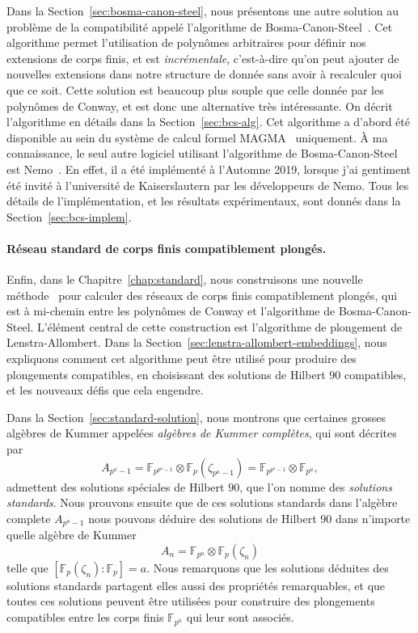 Dans la Section~\ref{sec:bosma-canon-steel}, nous présentons une autre solution
au problème de la compatibilité appelé l'algorithme de
Bosma-Canon-Steel~\cite{BCS97}. Cet algorithme permet l'utilisation de polynômes
arbitraires pour définir nos extensions de corps finis, et est
\emph{incrémentale}, c'est-à-dire qu'on peut ajouter de nouvelles extensions
dans notre structure de donnée sans avoir à recalculer quoi que ce soit. Cette
solution est beaucoup plus souple que celle donnée par les polynômes de Conway,
et est donc une alternative très intéressante. On décrit l'algorithme en détails
dans la Section~\ref{sec:bcs-alg}. Cet algorithme a d'abord été disponible au
sein du système de calcul formel MAGMA~\cite{Magma} uniquement. À ma
connaissance, le seul autre logiciel utilisant l'algorithme de Bosma-Canon-Steel
est Nemo~\cite{Nemo}. En effet, il a été implémenté à l'Automne 2019, lorsque
j'ai gentiment été invité à l'université de Kaiserslautern par les
développeurs de Nemo. Tous les détails de l'implémentation, et les résultats
expérimentaux, sont donnés dans la Section~\ref{sec:bcs-implem}.

\paragraph{Réseau standard de corps finis compatiblement plongés.} Enfin, dans
le Chapitre~\ref{chap:standard}, nous construisons une nouvelle
méthode~\cite{DRR19} pour calculer des réseaux de corps finis compatiblement
plongés, qui est à mi-chemin entre les polynômes de Conway et l'algorithme de
Bosma-Canon-Steel. L'élément central de cette construction est l'algorithme de
plongement de Lenstra-Allombert. Dans la
Section~\ref{sec:lenstra-allombert-embeddings}, nous expliquons comment cet
algorithme peut être utilisé pour produire des plongements compatibles, en
choisissant des solutions de Hilbert $90$ compatibles, et les nouveaux défis que
cela engendre.

Dans la Section~\ref{sec:standard-solution}, nous montrons que certaines grosses
algèbres de Kummer appelées \emph{algèbres de Kummer complètes}, qui sont
décrites par
\[
  A_{p^a-1} = \mathbb{F}_{p^{p^a-1}}\otimes\mathbb{F}_{p}(\zeta_{p^a-1})
  = \mathbb{F}_{p^{p^a-1}}\otimes \mathbb{F}_{p^a},
\]
admettent des solutions spéciales de Hilbert $90$, que l'on nomme des
\emph{solutions standards}. Nous prouvons ensuite que de ces solutions standards
dans l'algèbre complete $A_{p^a-1}$ nous pouvons déduire des solutions de
Hilbert $90$ dans n'importe quelle algèbre de Kummer
\[
  A_n = \mathbb{F}_{p^n}\otimes \mathbb{F}_{p}(\zeta_n)
\]
telle que $\left[ \mathbb{F}_p(\zeta_n):\mathbb{F}_p \right]=a$. Nous remarquons
que les solutions déduites des solutions standards partagent elles aussi des
propriétés remarquables, et que toutes ces solutions peuvent être utilisées pour
construire des plongements compatibles entre les corps finis
$\mathbb{F}_{p^n}$ qui leur sont associés.

